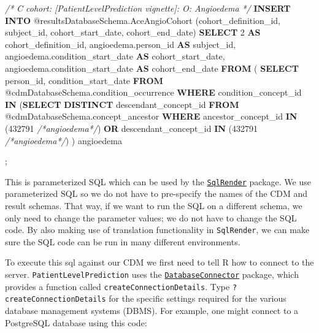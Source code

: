 \documentclass[
]{article}
\newenvironment{Shaded}{\begin{snugshade}}{\end{snugshade}}
\newcommand{\CommentTok}[1]{\textcolor[rgb]{0.56,0.35,0.01}{\textit{#1}}}
\newcommand{\DecValTok}[1]{\textcolor[rgb]{0.00,0.00,0.81}{#1}}
\newcommand{\KeywordTok}[1]{\textcolor[rgb]{0.13,0.29,0.53}{\textbf{#1}}}
\newcommand{\NormalTok}[1]{#1}
\begin{document}
\begin{Shaded}
\begin{Highlighting}[]
  \CommentTok{/*}
\CommentTok{    C cohort:  [PatientLevelPrediction vignette]:  O: Angioedema}
\CommentTok{  */}
    \KeywordTok{INSERT} \KeywordTok{INTO}\NormalTok{ @resultsDatabaseSchema.AceAngioCohort (cohort\_definition\_id, }
\NormalTok{                                                       subject\_id, }
\NormalTok{                                                       cohort\_start\_date, }
\NormalTok{                                                       cohort\_end\_date)}
  \KeywordTok{SELECT} \DecValTok{2} \KeywordTok{AS}\NormalTok{ cohort\_definition\_id,}
\NormalTok{  angioedema.person\_id }\KeywordTok{AS}\NormalTok{ subject\_id,}
\NormalTok{  angioedema.condition\_start\_date }\KeywordTok{AS}\NormalTok{ cohort\_start\_date,}
\NormalTok{  angioedema.condition\_start\_date }\KeywordTok{AS}\NormalTok{ cohort\_end\_date}
  \KeywordTok{FROM}  
\NormalTok{  (}
    \KeywordTok{SELECT}\NormalTok{ person\_id, condition\_start\_date}
    \KeywordTok{FROM}\NormalTok{ @cdmDatabaseSchema.condition\_occurrence}
    \KeywordTok{WHERE}\NormalTok{ condition\_concept\_id }\KeywordTok{IN}\NormalTok{ (}\KeywordTok{SELECT} \KeywordTok{DISTINCT}\NormalTok{ descendant\_concept\_id }\KeywordTok{FROM} 
\NormalTok{                                   @cdmDatabaseSchema.concept\_ancestor }\KeywordTok{WHERE}\NormalTok{ ancestor\_concept\_id }\KeywordTok{IN} 
\NormalTok{                                   (}\DecValTok{432791} \CommentTok{/*angioedema*/}\NormalTok{) }\KeywordTok{OR}\NormalTok{ descendant\_concept\_id }\KeywordTok{IN} 
\NormalTok{                                   (}\DecValTok{432791} \CommentTok{/*angioedema*/}\NormalTok{)}
\NormalTok{    ) angioedema}
    
\NormalTok{    ;}
    
\end{Highlighting}
\end{Shaded}

This is parameterized SQL which can be used by the
\href{http://github.com/OHDSI/SqlRender}{\texttt{SqlRender}} package. We
use parameterized SQL so we do not have to pre-specify the names of the
CDM and result schemas. That way, if we want to run the SQL on a
different schema, we only need to change the parameter values; we do not
have to change the SQL code. By also making use of translation
functionality in \texttt{SqlRender}, we can make sure the SQL code can
be run in many different environments.

To execute this sql against our CDM we first need to tell R how to
connect to the server. \texttt{PatientLevelPrediction} uses the
\href{http://github.com/ohdsi/DatabaseConnector}{\texttt{DatabaseConnector}}
package, which provides a function called
\texttt{createConnectionDetails}. Type \texttt{?createConnectionDetails}
for the specific settings required for the various database management
systems (DBMS). For example, one might connect to a PostgreSQL database
using this code:
\end{document}
